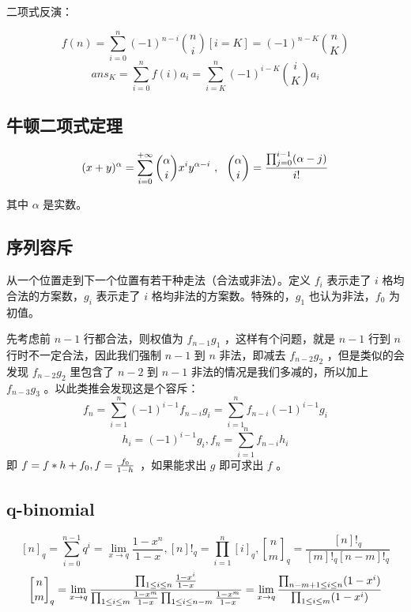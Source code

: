二项式反演：

\vspace{-0.4cm}

$$
f(n)=\sum_{i=0}^{n}(-1)^{n-i}{n\choose i}[i=K]=(-1)^{n-K}{n\choose K}
$$
$$
ans_K=\sum_{i=0}^{n}f(i)a_i=\sum_{i=K}^{n}(-1)^{i-K}{i\choose K}a_i
$$

\subsection{牛顿二项式定理}

$$
(x+y)^{\alpha}=\sum_{i=0}^{+\infty}{\alpha\choose i}x^iy^{\alpha-i}\ ,\ \ 
{\alpha\choose i}={\prod_{j=0}^{i-1}(\alpha-j)\over i!}
$$

其中 $\alpha$ 是实数。

\newpage

\subsection{序列容斥}

从一个位置走到下一个位置有若干种走法（合法或非法）。定义 $f_i$ 表示走了 $i$ 格均合法的方案数，$g_i$ 表示走了 $i$ 格均非法的方案数。特殊的，$g_1$ 也认为非法，$f_0$ 为初值。

先考虑前 $n-1$ 行都合法，则权值为 $f_{n-1}g_1$ ，这样有个问题，就是 $n-1$ 行到 $n$ 行时不一定合法，因此我们强制 $n-1$ 到 $n$ 非法，即减去 $f_{n-2}g_2$ ，但是类似的会发现 $f_{n-2}g_2$ 里包含了 $n-2$ 到 $n-1$ 非法的情况是我们多减的，所以加上 $f_{n-3}g_3$ 。以此类推会发现这是个容斥：
$$
f_{n}=\sum_{i=1}^{n}(-1)^{i-1}f_{n-i}g_i=\sum_{i=1}^{n}f_{n-i}(-1)^{i-1}g_{i}
$$
$$
h_{i}=(-1)^{i-1}g_i,f_n=\sum_{i=1}^{n}f_{n-i}h_i
$$
即 $f=f*h+f_{0},f={f_0\over 1-h}$ ，如果能求出 $g$ 即可求出 $f$ 。



\subsection{q-binomial}

$$
[n]_q = \sum\limits_{i=0}^{n-1} q^i = \lim_{x \rightarrow q} \frac{1-x^n}{1-x}, [ n ] !_q = \prod_{i=1}^n [i]_q, {n \brack m}_q = \frac {[n]!_q} {[m]!_q [n - m]!_q}
$$
$$
{n \brack m}_q = \lim_{x \rightarrow q} \frac{\prod_{1 \le i \le n}\frac{1-x^i}{1-x}}{\prod_{1 \le i \le m}\frac{1-x^m}{1-x}\prod_{1 \le i \le n-m}\frac{1-x^m}{1-x}} \\= \lim_{x \rightarrow q}\frac{\prod_{n-m+1 \le i \le n} (1-x^i)}{\prod_{1 \le i \le m} (1-x^i)}
$$

